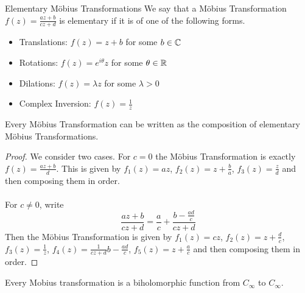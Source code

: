 \documentclass[a4paper]{article}
\begin{document}
\begin{defn}{Elementary Möbius Transformations}{} We say that a Möbius Transformation $f(z)=\frac{az+b}{cz+d}$ is elementary if it is of one of the following forms. 
\begin{itemize}
\item Translations: $f(z)=z+b$ for some $b\in\mathbb{C}$
\item Rotations: $f(z)=e^{i\theta}z$ for some $\theta\in\mathbb{R}$
\item Dilations: $f(z)=\lambda z$ for some $\lambda>0$
\item Complex Inversion: $f(z)=\frac{1}{z}$
\end{itemize}
\end{defn}

\begin{lmm}{}{} Every Möbius Transformation can be written as the composition of elementary Möbius Transformations. \tcbline
\begin{proof}
We consider two cases. For $c=0$ the Möbius Transformation is exactly $f(z)=\frac{az+b}{d}$. This is given by $f_1(z)=az$, $f_2(z)=z+\frac{b}{a}$, $f_3(z)=\frac{z}{d}$ and then composing them in order. \\~\\
For $c\neq 0$, write $$\frac{az+b}{cz+d}=\frac{a}{c}+\frac{b-\frac{ad}{c}}{cz+d}$$ Then the Möbius Transformation is given by $f_1(z)=cz$, $f_2(z)=z+\frac{d}{c}$, $f_3(z)=\frac{1}{z}$, $f_4(z)=\frac{1}{cz+d}b-\frac{ad}{c}$, $f_5(z)=z+\frac{a}{c}$ and then composing them in order. 
\end{proof}
\end{lmm}

\begin{lmm}{}{} Every Mobius transformation is a biholomorphic function from $C_\infty$ to $C_\infty$. 
\end{lmm}
\end{document}
